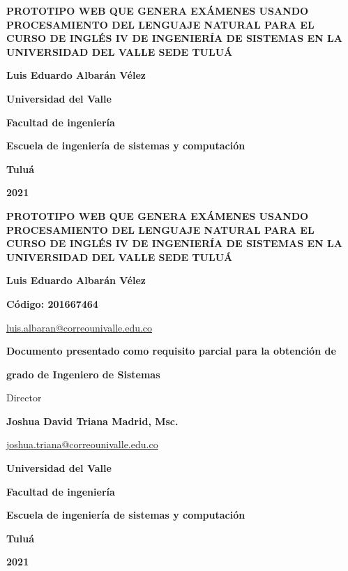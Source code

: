 \documentclass[../Main.tex]{subfiles}
\begin{document}
\thispagestyle{empty} %
\begin{center}

		{\bf PROTOTIPO WEB QUE GENERA EXÁMENES USANDO PROCESAMIENTO DEL LENGUAJE NATURAL PARA EL CURSO DE INGLÉS IV DE INGENIERÍA DE SISTEMAS EN LA UNIVERSIDAD DEL VALLE SEDE TULUÁ}
	    \vfill
		{\bf Luis Eduardo Albarán Vélez \par}
		\vfill
		{\bf Universidad del Valle  \par}
		{\bf Facultad de ingeniería \par}
		{\bf Escuela de ingeniería de sistemas y computación \par}
		{\bf Tuluá \par}
		{\bf 2021 \par}

\end{center}

\newpage
\thispagestyle{empty}
\begin{center}
	{\bf PROTOTIPO WEB QUE GENERA EXÁMENES USANDO PROCESAMIENTO DEL LENGUAJE NATURAL PARA EL CURSO DE INGLÉS IV DE INGENIERÍA DE SISTEMAS EN LA UNIVERSIDAD DEL VALLE SEDE TULUÁ}
		\vfill
		\vfill
		\vfill
		\vfill
		{\bf Luis Eduardo Albarán Vélez \par}
		{\bf Código: 201667464 \par}
		{\url{luis.albaran@correounivalle.edu.co} \par}
		\vfill
		\vfill
		\vfill
		\vfill
		{\bf Documento presentado como requisito parcial para la obtención de \par}
		{\bf grado de Ingeniero de Sistemas \par}
		\vfill
		\vfill
		\vfill
		\vfill
		{Director \par}
		{\bf Joshua David Triana Madrid, Msc. \par}
		{\url{joshua.triana@correounivalle.edu.co} \par}
		\vfill
		\vfill
		\vfill
		\vfill
		{\bf Universidad del Valle  \par}
		{\bf Facultad de ingeniería \par}
		{\bf Escuela de ingeniería de sistemas y computación \par}
		{\bf Tuluá \par}
		{\bf 2021 \par}

\end{center}
\end{document}
